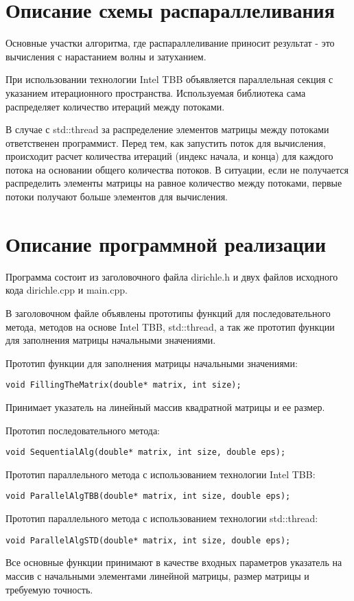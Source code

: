 \documentclass{report}
\begin{document}
\section*{Описание схемы распараллеливания}
\par Основные участки алгоритма, где распараллеливание приносит результат - это вычисления с нарастанием волны и затуханием.
\par При использовании технологии Intel TBB объявляется параллельная секция с указанием итерационного пространства. Используемая библиотека сама распределяет количество итераций между потоками.
\par В случае с std::thread за распределение элементов матрицы между потоками ответственен
программист. Перед тем, как запустить поток для вычисления, происходит расчет количества
итераций (индекс начала, и конца) для каждого потока на основании общего количества потоков. В ситуации, если не получается распределить элементы матрицы на равное количество между потоками, первые
потоки получают больше элементов для вычисления.
\newpage

\section*{Описание программной реализации}
Программа состоит из заголовочного файла dirichle.h и двух файлов исходного кода dirichle.cpp и main.cpp.
\par В заголовочном файле объявлены прототипы функций для последовательного метода, методов на основе Intel TBB, std::thread, а так же прототип функции для заполнения матрицы начальными значениями.
\par Прототип функции для заполнения матрицы начальными значениями:
\begin{lstlisting}
void FillingTheMatrix(double* matrix, int size);
\end{lstlisting}
Принимает указатель на линейный массив квадратной матрицы и ее размер.
\par Прототип последовательного метода:
\begin{lstlisting}
void SequentialAlg(double* matrix, int size, double eps);
\end{lstlisting}
\par Прототип параллельного метода с использованием технологии Intel TBB:
\begin{lstlisting}
void ParallelAlgTBB(double* matrix, int size, double eps);
\end{lstlisting}
\par Прототип параллельного метода с использованием технологии std::thread:
\begin{lstlisting}
void ParallelAlgSTD(double* matrix, int size, double eps);
\end{lstlisting}
\par Все основные функции принимают в качестве входных параметров указатель на массив с начальными элементами линейной матрицы, размер матрицы и требуемую точность.
\newpage
\end{document}
